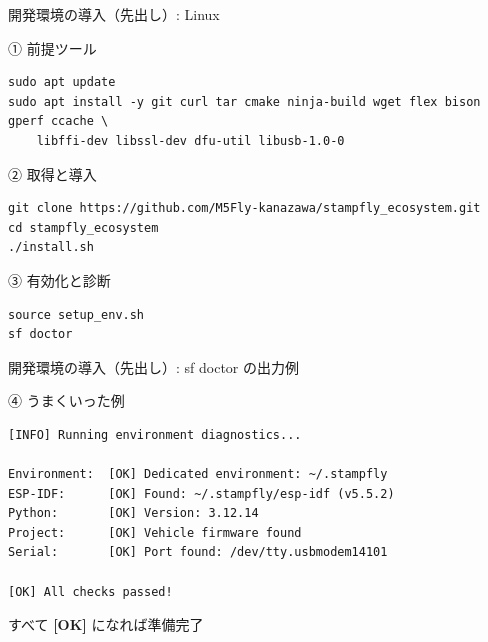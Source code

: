 \begin{frame}[fragile]{開発環境の導入（先出し）: Linux}
  \begin{exampleblock}{① 前提ツール}
    \begin{lstlisting}[style=sfbash, numbers=none, basicstyle=\ttfamily\scriptsize, aboveskip=1pt, belowskip=1pt]
sudo apt update
sudo apt install -y git curl tar cmake ninja-build wget flex bison gperf ccache \
    libffi-dev libssl-dev dfu-util libusb-1.0-0
    \end{lstlisting}
  \end{exampleblock}
  \begin{exampleblock}{② 取得と導入}
    \begin{lstlisting}[style=sfbash, numbers=none, basicstyle=\ttfamily\scriptsize, aboveskip=1pt, belowskip=1pt]
git clone https://github.com/M5Fly-kanazawa/stampfly_ecosystem.git
cd stampfly_ecosystem
./install.sh
    \end{lstlisting}
  \end{exampleblock}
  \begin{exampleblock}{③ 有効化と診断}
    \begin{lstlisting}[style=sfbash, numbers=none, basicstyle=\ttfamily\scriptsize, aboveskip=1pt, belowskip=1pt]
source setup_env.sh
sf doctor
    \end{lstlisting}
  \end{exampleblock}
\end{frame}

\begin{frame}[fragile]{開発環境の導入（先出し）: sf doctor の出力例}
  \begin{exampleblock}{④ うまくいった例}
    \begin{lstlisting}[style=sfbash, numbers=none, aboveskip=1pt, belowskip=1pt]
[INFO] Running environment diagnostics...

Environment:  [OK] Dedicated environment: ~/.stampfly
ESP-IDF:      [OK] Found: ~/.stampfly/esp-idf (v5.5.2)
Python:       [OK] Version: 3.12.14
Project:      [OK] Vehicle firmware found
Serial:       [OK] Port found: /dev/tty.usbmodem14101

[OK] All checks passed!
    \end{lstlisting}
  \end{exampleblock}

  \vspace{0.3em}
  \small すべて \textcolor{sfgreen}{\textbf{[OK]}} になれば準備完了
\end{frame}

